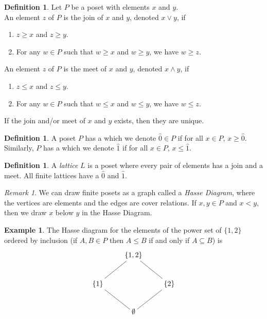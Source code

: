 \documentclass[psamsfonts]{amsart}
\theoremstyle{definition}
\newtheorem{defn}[thm]{Definition}
\newtheorem{exmp}[thm]{Example}
\theoremstyle{remark}
\newtheorem{rem}[thm]{Remark}
\numberwithin{equation}{section}
\begin{document}
\begin{defn}
Let $P$ be a poset with elements $x$ and $y$.\\
An element $z$ of $P$ is the join of $x$ and $y$, denoted $x\vee y$, if 
\begin{enumerate}
    \item $z\geq x$ and $z\geq y$.
    \item For any $w\in P$ such that $w\geq x$ and $w\geq y$, we have $w\geq z$.
\end{enumerate}
An element $z$ of $P$ is the meet of $x$ and $y$, denoted $x\wedge y$, if 
\begin{enumerate}
    \item $z\leq x$ and $z\leq y$.
    \item For any $w\in P$ such that $w\leq x$ and $w\leq y$, we have $w\leq z$.
\end{enumerate}
If the join and/or meet of $x$ and $y$ exists, then they are unique.
\end{defn}

\begin{defn}
  A poset $P$ has a  which we denote $\hat{0}\in P$ if for all $x\in P$, $x\geq \hat{0}$. Similarly, $P$ has a  which we denote $\hat{1}$ if for all $x\in P$, $x\leq \hat{1}$. 
\end{defn}
\begin{defn}
A \textit{lattice} $L$ is a poset where every pair of elements has a join and a meet. All finite lattices have a $\hat{0}$ and $\hat{1}$. 
\end{defn}

\begin{rem}
We can draw finite posets as a graph called a \textit{Hasse Diagram}, where the vertices are elements and the edges are cover relations. If $x,y\in P$ and $x<y$, then we draw $x$ below $y$ in the Hasse Diagram. 
\end{rem}
\begin{exmp}\label{Hasse example}
The Hasse diagram for the elements of the power set of $\{1,2\}$ ordered by inclusion (if $A, B \in P$ then $A\leq B$ if and only if $A\subseteq B$) is
\[
\xymatrix{
  & \{1,2\} \ar@{-}[dr] \ar@{-}[dl] \\
  \{1\} \ar@{-}[dr] & & \{2\} \ar@{-}[dl] \\
  & \emptyset}
\]
\end{exmp}
\end{document}

